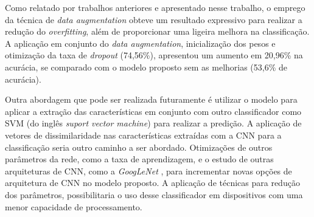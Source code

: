 \par Como relatado por trabalhos anteriores e apresentado nesse trabalho, o emprego da técnica de \textit{data augmentation} obteve um resultado expressivo para realizar a redução do \textit{overfitting}, além de proporcionar uma ligeira melhora na classificação. A aplicação em conjunto do \textit{data augmentation}, inicialização dos pesos e otimização da taxa de \textit{dropout} (74,56\%), apresentou um aumento em 20,96\% na acurácia, se comparado com o modelo proposto sem as melhorias (53,6\% de acurácia).

\par Outra abordagem que pode ser realizada futuramente é utilizar o modelo para aplicar a extração das características em conjunto com outro classificador como SVM (do inglês \textit{suport vector machine}) para realizar a predição. A aplicação de vetores de dissimilaridade nas características extraídas com a CNN para a classificação seria outro caminho a ser abordado. Otimizações de outros parâmetros da rede, como a taxa de aprendizagem, e o estudo de outras arquiteturas de CNN, como a \textit{GoogLeNet} \cite{szegedy2015going}, para incrementar novas opções de arquitetura de CNN no modelo proposto. A aplicação de técnicas para redução dos parâmetros, possibilitaria o uso desse classificador em dispositivos com uma menor capacidade de processamento.